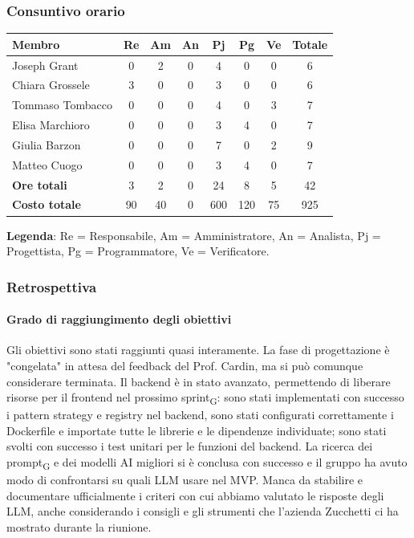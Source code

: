 \documentclass[11pt,a4paper]{article}
\newcommand{\gls}[1]{#1\textsubscript{G}}
\begin{document}
\subsubsection{Consuntivo orario}
\begin{center}
    \begin{tabular}{|l|c|c|c|c|c|c|c|}
        \hline
        \textbf{Membro} & \textbf{Re} & \textbf{Am} & \textbf{An} & \textbf{Pj} & \textbf{Pg} & \textbf{Ve} & \textbf{Totale} \\
        \hline
        Joseph Grant & 0 & 2 & 0 & 4 & 0 & 0 & 6 \\
        \hline
        Chiara Grossele & 3 & 0 & 0 & 3 & 0 & 0 & 6 \\
        \hline
        Tommaso Tombacco & 0 & 0 & 0 & 4 & 0 & 3 & 7 \\
        \hline
        Elisa Marchioro & 0 & 0 & 0 & 3 & 4 & 0 & 7 \\
        \hline
        Giulia Barzon & 0 & 0 & 0 & 7 & 0 & 2 & 9 \\
        \hline
        Matteo Cuogo & 0 & 0 & 0 & 3 & 4 & 0 & 7 \\
        \hline
        \textbf{Ore totali} & 3 & 2 & 0 & 24 & 8 & 5 & 42 \\
        \hline
        \textbf{Costo totale} & 90 & 40 & 0 & 600 & 120 & 75 & 925 \\
        \hline
    \end{tabular}
\end{center}

\noindent \textbf{Legenda}: Re = Responsabile, Am = Amministratore, An = Analista, Pj = Progettista, Pg = Programmatore, Ve = Verificatore.

\subsubsection{Retrospettiva}
\paragraph{Grado di raggiungimento degli obiettivi}
Gli obiettivi sono stati raggiunti quasi interamente. La fase di progettazione è "congelata" in attesa del feedback del Prof. Cardin, ma si può comunque considerare terminata.
Il backend è in stato avanzato, permettendo di liberare risorse per il frontend nel prossimo \gls{sprint}: sono stati implementati con successo i pattern strategy e registry nel backend, sono stati configurati correttamente i Dockerfile e importate tutte le librerie e le dipendenze individuate; sono stati svolti con successo i test unitari per le funzioni del backend.
La ricerca dei \gls{prompt} e dei modelli AI migliori si è conclusa con successo e il gruppo ha avuto modo di confrontarsi su quali LLM usare nel MVP. Manca da stabilire e documentare ufficialmente i criteri con cui abbiamo valutato le risposte degli LLM, anche considerando i consigli e gli strumenti che l'azienda Zucchetti ci ha mostrato durante la riunione.
\end{document}

